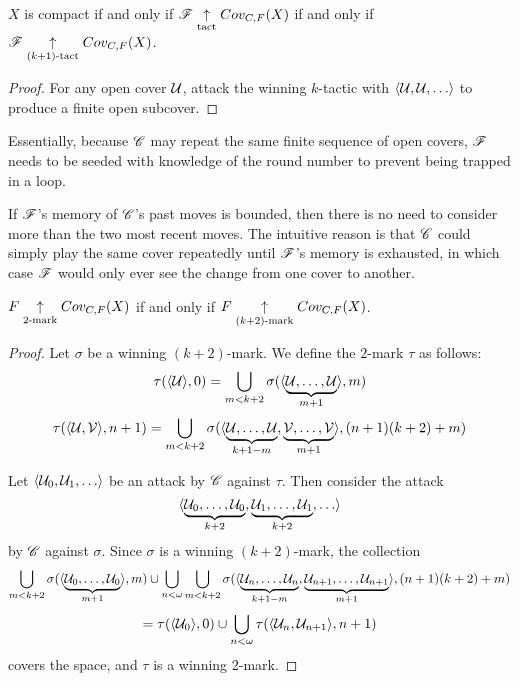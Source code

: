 \begin{prop}
  $X$ is compact if and only if
  $\mathscr{F} \underset{\text{tact}}{\uparrow} Cov_{C,F}(X)$ if and only if
  $\mathscr{F} \underset{(k+1)\text{-tact}}{\uparrow} Cov_{C,F}(X)$.
\end{prop}

\begin{proof}
  For any open cover $\mathcal{U}$, attack the winning $k$-tactic with
  $\<\mc U,\mc U,\dots\>$ to produce a finite open subcover.
\end{proof}

Essentially, because $\mathscr{C}$ may repeat the same finite sequence of open covers,
$\mathscr{F}$ needs to be seeded with knowledge of the round number to prevent being
trapped in a loop.

If $\mathscr{F}$'s memory of $\mathscr{C}$'s past moves is bounded, then
there is no need to consider more than the two most recent moves. The
intuitive reason is that $\mathscr{C}$ could simply play the same cover repeatedly
until $\mathscr{F}$'s memory is exhausted, in which case $\mathscr{F}$ would only ever
see the change from one cover to another.

\begin{thm}
  $F \underset{2\text{-mark}}{\uparrow} Cov_{C,F}(X)$ if and only if $F \underset{(k+2)\text{-mark}}{\uparrow} Cov_{C,F}(X)$.
\end{thm}

\begin{proof}
  Let $\sigma$ be a winning $(k+2)$-mark. We define the $2$-mark $\tau$ as
  follows:
    \[
      \tau(\langle\mathcal{U}\rangle,0)
        =
      \bigcup_{m<k+2}
        \sigma(\langle\underbrace{\mathcal{U},\dots,\mathcal{U}}_{m+1}\rangle,m)
    \]
    \[
      \tau(\langle\mathcal{U},\mathcal{V}\rangle,n+1)
        =
      \bigcup_{m<k+2}
        \sigma(\langle
          \underbrace{\mathcal{U},\dots,\mathcal{U}}_{k+1-m},
          \underbrace{\mathcal{V},\dots,\mathcal{V}}_{m+1}
        \rangle,(n+1)(k+2)+m)
    \]

  Let $\<\mc U_0,\mc U_1,\dots\>$ be an attack by $\mathscr{C}$ against $\tau$.
  Then consider the attack
    \[
      \<
        \underbrace{\mc U_0,\dots,\mc U_0}_{k+2},
        \underbrace{\mc U_1,\dots,\mc U_1}_{k+2},
        \dots
      \>
    \]
  by $\mathscr{C}$ against $\sigma$. Since $\sigma$ is a winning $(k+2)$-mark, the
  collection
    \[
      \bigcup_{m<k+2}
        \sigma(\langle\underbrace{\mathcal{U}_0,\dots,\mathcal{U}_0}_{m+1}\rangle,m)
      \cup
      \bigcup_{n<\omega}
      \bigcup_{m<k+2}
        \sigma(\langle
          \underbrace{\mathcal{U}_n,\dots,\mathcal{U}_n}_{k+1-m},
          \underbrace{\mathcal{U}_{n+1},\dots,\mathcal{U}_{n+1}}_{m+1}
        \rangle,(n+1)(k+2)+m)
    \]
    \[
      =
      \tau(\langle\mathcal{U}_0\rangle,0)
      \cup
      \bigcup_{n<\omega}
      \tau(\langle\mathcal{U}_n,\mathcal{U}_{n+1}\rangle,n+1)
    \]
  covers the space, and $\tau$ is a winning $2$-mark.
\end{proof}

